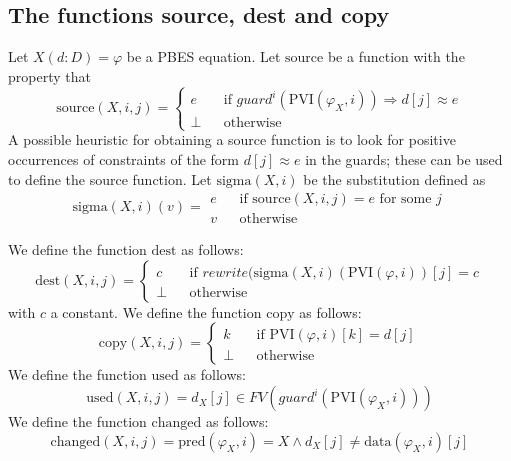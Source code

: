 \documentclass{article}
\begin{document}
\subsection{The functions source, dest and copy}

Let $X(d:D)=\varphi $ be a PBES equation. Let $\mathrm{source}$ be a
function with the property that 
\begin{equation*}
\mathrm{source}(X,i,j)=\left\{ 
\begin{array}{lll}
e &  & \text{if }guard^{i}(\mathrm{PVI}(\varphi _{X},i))\Rightarrow
d[j]\approx e \\ 
\bot &  & \text{otherwise}%
\end{array}%
\right.
\end{equation*}%
A possible heuristic for obtaining a source function is to look for positive
occurrences of constraints of the form $d[j]\approx e$ in the guards; these
can be used to define the source function. Let $\mathrm{sigma}(X,i)$ be the
substitution defined as%
\begin{equation*}
\mathrm{sigma}(X,i)(v)=%
\begin{array}{lll}
e &  & \text{if }\mathrm{source}(X,i,j)=e\text{ for some }j \\ 
v &  & \text{otherwise}%
\end{array}%
\end{equation*}

We define the function $\mathrm{dest}$ as follows:%
\begin{equation*}
\mathrm{dest}(X,i,j)=\left\{ 
\begin{array}{lll}
c &  & \text{if }rewrite(\mathrm{sigma}(X,i)(\mathrm{PVI}(\varphi ,i))[j]=c
\\ 
\bot &  & \text{otherwise}%
\end{array}%
\right.
\end{equation*}%
with $c$ a constant. We define the function $\mathrm{copy}$ as follows:%
\begin{equation*}
\mathrm{copy}(X,i,j)=\left\{ 
\begin{array}{lll}
k &  & \text{if }\mathrm{PVI}(\varphi ,i)[k]=d[j] \\ 
\bot &  & \text{otherwise}%
\end{array}%
\right.
\end{equation*}%
We define the function $\mathrm{used}$ as follows:%
\begin{equation*}
\mathrm{used}(X,i,j)=d_{X}[j]\in FV(guard^{i}(\mathrm{PVI}(\varphi _{X},i)))
\end{equation*}%
We define the function $\mathrm{changed}$ as follows:%
\begin{equation*}
\mathrm{changed}(X,i,j)=\mathrm{pred}(\varphi _{X},i)=X\wedge d_{X}[j]\neq 
\mathrm{data}(\varphi _{X},i)[j]
\end{equation*}
\end{document}
